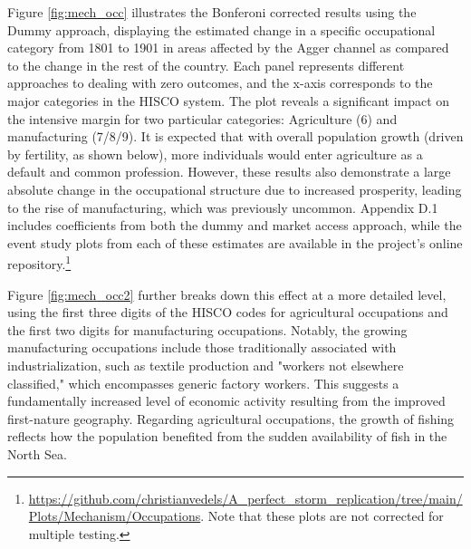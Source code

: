 \documentclass[11pt]{article}
\begin{document}
Figure \ref{fig:mech_occ} illustrates the Bonferoni corrected results using the Dummy approach, displaying the estimated change in a specific occupational category from 1801 to 1901 in areas affected by the Agger channel as compared to the change in the rest of the country. Each panel represents different approaches to dealing with zero outcomes, and the x-axis corresponds to the major categories in the HISCO system. The plot reveals a significant impact on the intensive margin for two particular categories: Agriculture (6) and manufacturing (7/8/9).  It is expected that with overall population growth (driven by fertility, as shown below), more individuals would enter agriculture as a default and common profession. However, these results also demonstrate a large absolute change in the occupational structure due to increased prosperity, leading to the rise of manufacturing, which was previously uncommon. Appendix D.1 includes coefficients from both the dummy and market access approach, while the event study plots from each of these estimates are available in the project's online repository.\footnote{
\url{https://github.com/christianvedels/A_perfect_storm_replication/tree/main/Plots/Mechanism/Occupations}. Note that these plots are not corrected for multiple testing. 
}

Figure \ref{fig:mech_occ2} further breaks down this effect at a more detailed level, using the first three digits of the HISCO codes for agricultural occupations and the first two digits for manufacturing occupations. Notably, the growing manufacturing occupations include those traditionally associated with industrialization, such as textile production and "workers not elsewhere classified," which encompasses generic factory workers. This suggests a fundamentally increased level of economic activity resulting from the improved first-nature geography. Regarding agricultural occupations, the growth of fishing reflects how the population benefited from the sudden availability of fish in the North Sea. 
\end{document}
